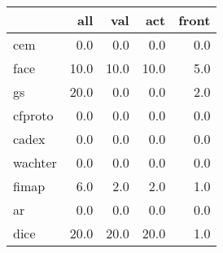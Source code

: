 \begin{tabular}{lrrrr}
\hline
{} &   all &   val &   act &  front \\ \hline
\hline
cem                 &   0.0 &   0.0 &   0.0 &    0.0 \\ \hline
face                &  10.0 &  10.0 &  10.0 &    5.0 \\ \hline
gs     &  20.0 &   0.0 &   0.0 &    2.0 \\ \hline
cfproto             &   0.0 &   0.0 &   0.0 &    0.0 \\ \hline
cadex               &   0.0 &   0.0 &   0.0 &    0.0 \\ \hline
wachter             &   0.0 &   0.0 &   0.0 &    0.0 \\ \hline
fimap               &   6.0 &   2.0 &   2.0 &    1.0 \\ \hline
ar &   0.0 &   0.0 &   0.0 &    0.0 \\ \hline
dice                &  20.0 &  20.0 &  20.0 &    1.0 \\ \hline
\hline
\end{tabular}
